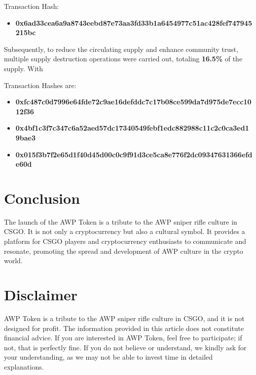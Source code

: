 \documentclass[journal,onecolumn,]{IEEEtran}
\begin{document}
	Transaction Hash:
	
		\begin{itemize}
		\item 	\textbf{0x6ad33cea6a9a8743eebd87e73aa3fd33b1a6454977c51ac428fef747945215bc}
	\end{itemize}



	Subsequently, to reduce the circulating supply and enhance community trust, multiple supply destruction operations were carried out, totaling \textbf{16.5\%} of the supply. With
	
	Transaction Hashes are:
	
	\begin{itemize}
		\item \textbf{0xfc487c0d7996e64fde72c9ae16defddc7c17b08ce599da7d975de7ecc1012f36}
		\item \textbf{0x4bf1c3f7c347c6a52aed57dc17340549febf1edc882988c11c2c0ca3ed19bae3}
		\item \textbf{0x015f3b7f2e65d1f40d45d00c0c9f91d3ce5ca8e776f2dc09347631366efde60d}
	\end{itemize}
	
	\section{Conclusion}
	The launch of the AWP Token is a tribute to the AWP sniper rifle culture in CSGO. It is not only a cryptocurrency but also a cultural symbol. It provides a platform for CSGO players and cryptocurrency enthusiasts to communicate and resonate, promoting the spread and development of AWP culture in the crypto world.
	
	
	\section*{Disclaimer}

			AWP Token is a tribute to the AWP sniper rifle culture in CSGO, and it is not designed for profit. The information provided in this article does not constitute financial advice. If you are interested in AWP Token, feel free to participate; if not, that is perfectly fine. If you do not believe or understand, we kindly ask for your understanding, as we may not be able to invest time in detailed explanations.
		
		
	\vfill
	
	


	
	\vfill
		
\end{document}
